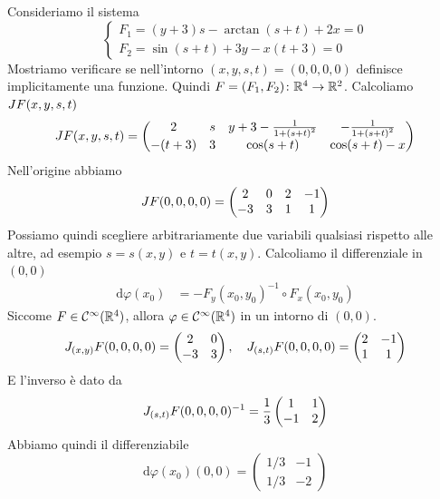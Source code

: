 \documentclass[a4paper]{article}
\begin{document}
\begin{radioactive}
\begin{snippetexercise}{}
    Consideriamo il sistema
    \[
        \begin{cases}
            F_1 = (y+3)s - \arctan(s + t) + 2x = 0 \\
            F_2 = \sin(s + t) + 3y - x(t + 3) = 0
        \end{cases}
    \]
    Mostriamo verificare se nell'intorno \((x,y,s,t) = (0,0,0,0)\)
    definisce implicitamente una funzione.
    Quindi \(F = (F_1, F_2) \colon \mathbb{R}^4 \to \mathbb{R}^2\).
    Calcoliamo \(J F(x,y,s,t)\)
    \[
        J F(x,y,s,t) = \begin{pmatrix}
            2 & s & y+3 - \frac{1}{1 + {(s+t)}^2} & -\frac{1}{1 + {(s+t)}^2} \\
            -(t + 3) & 3 & \cos(s + t) & \cos(s + t) - x
        \end{pmatrix}
    \]
    Nell'origine abbiamo
    \[
        J F(0,0,0,0) = \begin{pmatrix}
            2 & 0 & 2 & -1 \\
            -3 & 3 & 1 & 1
        \end{pmatrix}
    \]
    Possiamo quindi scegliere arbitrariamente due variabili qualsiasi rispetto alle altre, ad esempio
    \(s= s(x,y)\) e \(t = t(x,y)\).
    Calcoliamo il differenziale in \((0,0)\)
    \begin{align*}
        \text{d}\varphi(x_0) &= -F_y(x_0, y_0)^{-1} \circ F_x(x_0, y_0)
    \end{align*}
    Siccome \(F \in \mathcal{C}^\infty(\mathbb{R}^4)\), allora \(\varphi \in \mathcal{C}^\infty(\mathbb{R}^4)\)
    in un intorno di \((0,0)\).
    \begin{align*}
        J_{(x,y)}F(0,0,0,0) = \begin{pmatrix}
            2 & 0 \\ -3 & 3
        \end{pmatrix}, \quad J_{(s,t)}F(0,0,0,0) = \begin{pmatrix}
            2 & -1 \\ 1 & 1
        \end{pmatrix}
    \end{align*}
    E l'inverso è dato da
    \begin{align*}
        J_{(s,t)}F(0,0,0,0)^{-1} = \frac{1}{3} \begin{pmatrix}1 & 1 \\ -1 & 2\end{pmatrix}
    \end{align*}
    Abbiamo quindi il differenziabile
    \[
        \text{d}\varphi(x_0)(0,0) = \begin{pmatrix}
            1/3 & -1 \\ 1/3 & -2
        \end{pmatrix}  
    \]
\end{snippetexercise}
\end{radioactive}
\end{document}
